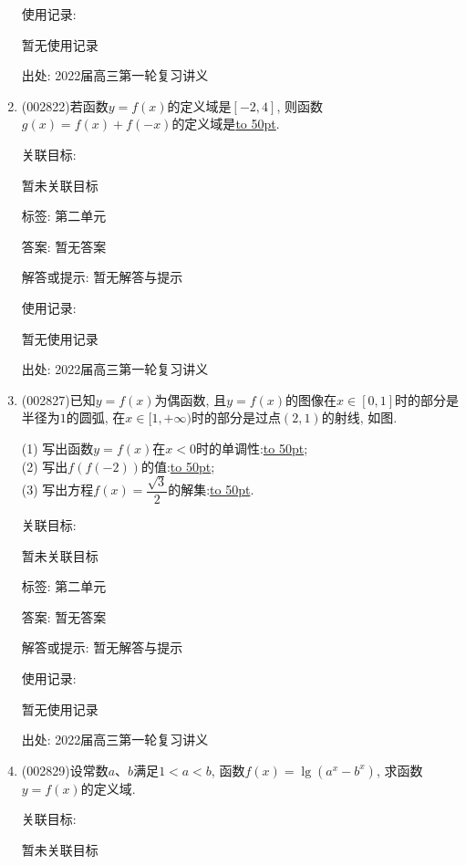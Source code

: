 \documentclass[10pt,a4paper]{article}
\newcommand{\blank}[1]{\underline{\hbox to #1pt{}}}
\begin{document}
\begin{enumerate}[1.]
使用记录:

暂无使用记录


出处: 2022届高三第一轮复习讲义
\item { (002822)}若函数$y=f(x)$的定义域是$[-2,4]$, 则函数$g(x)=f(x)+f(-x)$的定义域是\blank{50}.


关联目标:

暂未关联目标



标签: 第二单元

答案: 暂无答案

解答或提示: 暂无解答与提示

使用记录:

暂无使用记录


出处: 2022届高三第一轮复习讲义
\item { (002827)}已知$y=f(x)$为偶函数, 且$y=f(x)$的图像在$x\in [0,1]$时的部分是半径为$1$的圆弧, 在$x\in [1,+\infty)$时的部分是过点$(2,1)$的射线, 如图.\\
\begin{center}
\end{center}
(1) 写出函数$y=f(x)$在$x<0$时的单调性:\blank{50};\\
(2) 写出$f(f(-2))$的值:\blank{50};\\
(3) 写出方程$f(x)=\dfrac{\sqrt 3}2$的解集:\blank{50}.


关联目标:

暂未关联目标



标签: 第二单元

答案: 暂无答案

解答或提示: 暂无解答与提示

使用记录:

暂无使用记录


出处: 2022届高三第一轮复习讲义
\item { (002829)}设常数$a$、$b$满足$1<a<b$, 函数$f(x)=\lg(a^x-b^x)$, 求函数$y=f(x)$的定义域.


关联目标:

暂未关联目标




\end{enumerate}
\end{document}
